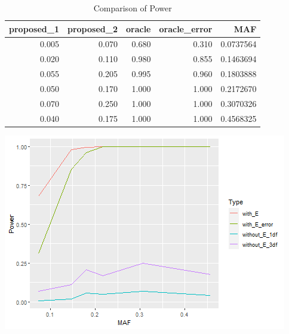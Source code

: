 \documentclass[
]{article}
\newenvironment{Shaded}{\begin{snugshade}}{\end{snugshade}}
\newcommand{\CommentTok}[1]{\textcolor[rgb]{0.56,0.35,0.01}{\textit{#1}}}
\newcommand{\DataTypeTok}[1]{\textcolor[rgb]{0.13,0.29,0.53}{#1}}
\newcommand{\DecValTok}[1]{\textcolor[rgb]{0.00,0.00,0.81}{#1}}
\newcommand{\KeywordTok}[1]{\textcolor[rgb]{0.13,0.29,0.53}{\textbf{#1}}}
\newcommand{\NormalTok}[1]{#1}
\newcommand{\OperatorTok}[1]{\textcolor[rgb]{0.81,0.36,0.00}{\textbf{#1}}}
\newcommand{\StringTok}[1]{\textcolor[rgb]{0.31,0.60,0.02}{#1}}
\begin{document}
\begin{table}

\caption{\label{tab:unnamed-chunk-8}Comparison of Power}
\centering
\begin{tabular}[t]{r|r|r|r|r}
\hline
proposed\_1 & proposed\_2 & oracle & oracle\_error & MAF\\
\hline
0.005 & 0.070 & 0.680 & 0.310 & 0.0737564\\
\hline
0.020 & 0.110 & 0.980 & 0.855 & 0.1463694\\
\hline
0.055 & 0.205 & 0.995 & 0.960 & 0.1803888\\
\hline
0.050 & 0.170 & 1.000 & 1.000 & 0.2172670\\
\hline
0.070 & 0.250 & 1.000 & 1.000 & 0.3070326\\
\hline
0.040 & 0.175 & 1.000 & 1.000 & 0.4568325\\
\hline
\end{tabular}
\end{table}

\begin{Shaded}
\end{Shaded}

\includegraphics{stats-gene-research-progress-v9_files/figure-latex/unnamed-chunk-8-1.png}
\end{document}
